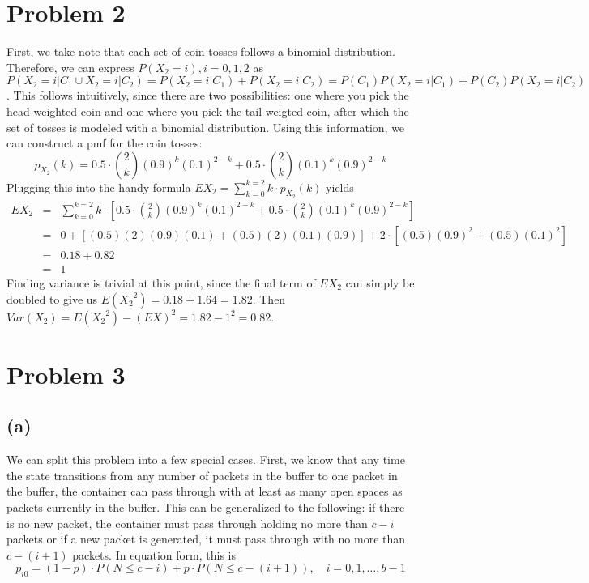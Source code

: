 \documentclass{article}
\begin{document}
\section*{Problem 2}

First, we take note that each set of coin tosses follows a binomial
distribution. Therefore, we can express $P( X_2 = i ), i = 0,1,2$ as $P( X_2 =
i | C_1 \cup X_2 = i | C_2 ) = P( X_2 = i | C_1 ) + P( X_2 = i | C_2 ) = P(
C_1) P( X_2 = i | C_1 ) + P( C_2 )P( X_2 = i | C_2 )$. This follows
intuitively, since there are two possibilities: one where you pick the
head-weighted coin and one where you pick the tail-weigted coin, after which
the set of tosses is modeled with a binomial distribution. Using this
information, we can construct a pmf for the coin tosses:
\begin{equation*}
  p_{X_2}(k) = 0.5\cdot\binom{2}{k}(0.9)^k(0.1)^{2 - k} +
  0.5\cdot\binom{2}{k}(0.1)^k(0.9)^{2 - k}
\end{equation*}
Plugging this into the handy formula $EX_2 = \sum\limits_{k=0}^{k=2} k\cdot
p_{X_2}(k)$ yields
\begin{eqnarray*}
  EX_2 &=& \sum\limits_{k=0}^{k=2}
  k\cdot\left[0.5\cdot\binom{2}{k}(0.9)^k(0.1)^{2 - k} +
  0.5\cdot\binom{2}{k}(0.1)^k(0.9)^{2 - k}\right] \\
  &=& 0 + \left[(0.5)(2)(0.9)(0.1) + (0.5)(2)(0.1)(0.9)\right] +
  2\cdot\left[(0.5)(0.9)^2 + (0.5)(0.1)^2\right] \\
  &=& 0.18 + 0.82 \\
  &=& 1
\end{eqnarray*}
Finding variance is trivial at this point, since the final term of $EX_2$ can
simply be doubled to give us $E({X_2}^2) = 0.18 + 1.64 = 1.82$. Then $Var(X_2) =
E({X_2}^2) - (EX)^2 = 1.82 - 1^2 = 0.82$.

\section*{Problem 3}

\subsection*{(a)}

We can split this problem into a few special cases. First, we know that any
time the state transitions from any number of packets in the buffer to one
packet in the buffer, the container can pass through with at least as many open
spaces as packets currently in the buffer. This can be generalized to the
following: if there is no new packet, the container must pass through holding
no more than $c - i$ packets or if a new packet is generated, it must pass
through with no more than $c - ( i + 1 )$ packets. In equation form, this is
\begin{equation} 
 p_{i0} = (1 - p)\cdot P( N \leq c - i ) + p\cdot P( N \leq c - (i + 1) ),
 \quad i=0,1,\ldots,b-1
\end{equation}
\end{document}
